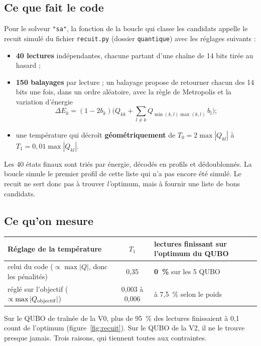 \subsection{Ce que fait le code}
Pour le solveur \texttt{"sa"}, la fonction de la boucle qui classe les candidats appelle le recuit simulé du fichier \texttt{recuit.py} (dossier \texttt{quantique}) avec les réglages suivants :
\begin{itemize}
\item \textbf{40 lectures} indépendantes, chacune partant d'une chaîne de 14 bits tirée au hasard ;
\item \textbf{150 balayages} par lecture ; un balayage propose de retourner chacun des 14 bits une fois, dans un ordre aléatoire, avec la règle de Metropolis et la variation d'énergie
\[ \Delta E_k=(1-2b_k)\Big(Q_{kk}+\sum_{l\ne k}Q_{\min(k,l)\max(k,l)}\,b_l\Big) ; \]
\item une température qui décroît \textbf{géométriquement} de $T_0=2\max|Q_{kl}|$ à $T_1=0{,}01\max|Q_{kl}|$.
\end{itemize}
Les 40 états finaux sont triés par énergie, décodés en profils et dédoublonnés. La boucle simule le premier profil de cette liste qui n'a pas encore été simulé. Le recuit ne sert donc pas à trouver \emph{l'}optimum, mais à fournir une liste de bons candidats.

\subsection{Ce qu'on mesure}
\begin{center}
\renewcommand{\arraystretch}{1.2}
\begin{tabularx}{\linewidth}{>{\raggedright\arraybackslash}X c >{\raggedright\arraybackslash}p{4.4cm}}
\toprule
Réglage de la température & $T_1$ & lectures finissant sur l'optimum du QUBO \\
\midrule
celui du code ($\propto\max|Q|$, donc les pénalités) & 0,35 & \textbf{0~\%} sur les 5 QUBO \\
réglé sur l'objectif ($\propto\max|Q_{\rm objectif}|$) & 0,003 à 0,006 & 0 à 7,5~\% selon le poids \\
\bottomrule
\end{tabularx}
\end{center}
Sur le QUBO de traînée de la V0, plus de 95~\% des lectures finissaient à 0,1 count de l'optimum (figure~\ref{fig:recuit}). Sur le QUBO de la V2, il ne le trouve presque jamais. Trois raisons, qui tiennent toutes aux contraintes.

